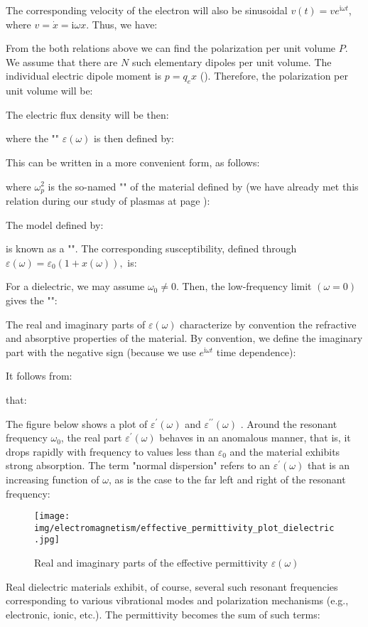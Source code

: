 	The corresponding velocity of the electron will also be sinusoidal $v(t)=v e^{\mathrm{i}\omega t}$, where $v=\dot{x}=\mathrm{i} \omega x$. Thus, we have:
	
	From the both relations above we can find the polarization per unit volume $P$. We assume that there are $N$ such elementary dipoles per unit volume. The individual electric dipole moment is $p=q_e x$ (). Therefore, the polarization per unit volume will be:
	
	The electric flux density will be then:
	
	where the "" $\varepsilon(\omega)$ is then defined by:
	
	This can be written in a more convenient form, as follows:
	
	where $\omega_{p}^{2}$ is the so-named "" of the material defined by (we have already met this relation during our study of plasmas at page \pageref{plasma frequency}):
	
	The model defined by:
	
	is known as a "". The corresponding susceptibility, defined through $\varepsilon(\omega)=\varepsilon_{0}(1+x(\omega)),$ is:
	
	For a dielectric, we may assume $\omega_{0} \neq 0$. Then, the low-frequency limit $(\omega=0)$ gives the "":
	
	The real and imaginary parts of $\varepsilon(\omega)$ characterize by convention the refractive and absorptive properties of the material. By convention, we define the imaginary part with the negative sign (because we use $e^{\mathrm{i} \omega t}$ time dependence):
	
	It follows from:
	
	that:
	
	The figure below shows a plot of $\varepsilon^{\prime}(\omega)$ and $\varepsilon^{\prime \prime}(\omega)$ . Around the resonant frequency $\omega_{0}$, the real part $\varepsilon^{\prime}(\omega)$ behaves in an anomalous manner, that is, it drops rapidly with frequency to values less than $\varepsilon_{0}$ and the material exhibits strong absorption. The term "normal dispersion" refers to an $\varepsilon^{\prime}(\omega)$ that is an increasing function of $\omega$, as is the case to the far left and right of the resonant frequency:
	\begin{figure}[H]
		\centering
		\texttt{[image: img/electromagnetism/effective\_permittivity\_plot\_dielectric.jpg]}
		\caption{Real and imaginary parts of the effective permittivity $\varepsilon(\omega)$}
	\end{figure} 
	Real dielectric materials exhibit, of course, several such resonant frequencies corresponding to various vibrational modes and polarization mechanisms (e.g., electronic, ionic, etc.). The permittivity becomes the sum of such terms:
	
